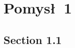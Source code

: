 \documentclass[module]{subfiles}
\begin{document}
\clearpage

\part{Pomys\l\ 1}

\chapter{Section 1.1}

\lipsum[1]
\end{document}
